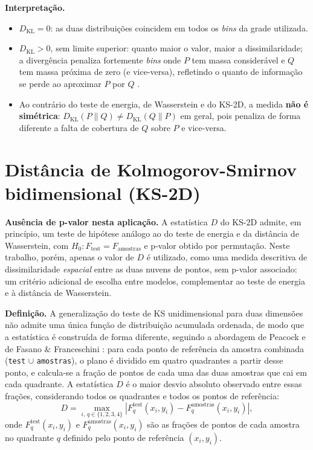 \documentclass[11pt,a4paper]{article}
\begin{document}
\textbf{Interpretação.}
\begin{itemize}
  \item $D_{\mathrm{KL}} = 0$: as duas distribuições coincidem em todos
  os \textit{bins} da grade utilizada.
  \item $D_{\mathrm{KL}} > 0$, sem limite superior: quanto maior o valor,
  maior a dissimilaridade; a divergência penaliza fortemente
  \textit{bins} onde $P$ tem massa considerável e $Q$ tem massa próxima
  de zero (e vice-versa), refletindo o quanto de informação se perde ao
  aproximar $P$ por $Q$ \cite{kullback1951}.
  \item Ao contrário do teste de energia, de Wasserstein e do KS-2D, a
  medida \textbf{não é simétrica}: $D_{\mathrm{KL}}(P\parallel Q) \neq
  D_{\mathrm{KL}}(Q\parallel P)$ em geral, pois penaliza de forma
  diferente a falta de cobertura de $Q$ sobre $P$ e vice-versa.
\end{itemize}

\section{Distância de Kolmogorov-Smirnov bidimensional (KS-2D)}

\textbf{Ausência de p-valor nesta aplicação.} A estatística $D$ do
KS-2D admite, em princípio, um teste de hipótese análogo ao do teste de
energia e da distância de Wasserstein, com $H_0: F_{\text{test}} =
F_{\text{amostras}}$ e p-valor obtido por permutação. Neste trabalho,
porém, apenas o valor de $D$ é utilizado, como uma medida descritiva de
dissimilaridade \emph{espacial} entre as duas nuvens de pontos, sem
p-valor associado: um critério adicional de escolha entre modelos,
complementar ao teste de energia e à distância de Wasserstein.

\textbf{Definição.} A generalização do teste de KS unidimensional para
duas dimensões não admite uma única função de distribuição acumulada
ordenada, de modo que a estatística é construída de forma diferente,
seguindo a abordagem de Peacock \cite{peacock1983} e de Fasano \&
Franceschini \cite{fasano1987}: para cada ponto de referência da amostra
combinada (\texttt{test} $\cup$ \texttt{amostras}), o plano é dividido em
quatro quadrantes a partir desse ponto, e calcula-se a fração de pontos
de cada uma das duas amostras que cai em cada quadrante. A estatística
$D$ é o maior desvio absoluto observado entre essas frações, considerando
todos os quadrantes e todos os pontos de referência:
\[
D = \max_{i,\, q \in \{1,2,3,4\}} \left|
F^{\text{test}}_q(x_i, y_i) - F^{\text{amostras}}_q(x_i, y_i)
\right|,
\]
onde $F^{\text{test}}_q(x_i, y_i)$ e $F^{\text{amostras}}_q(x_i, y_i)$ são
as frações de pontos de cada amostra no quadrante $q$ definido pelo ponto
de referência $(x_i, y_i)$.
\end{document}
